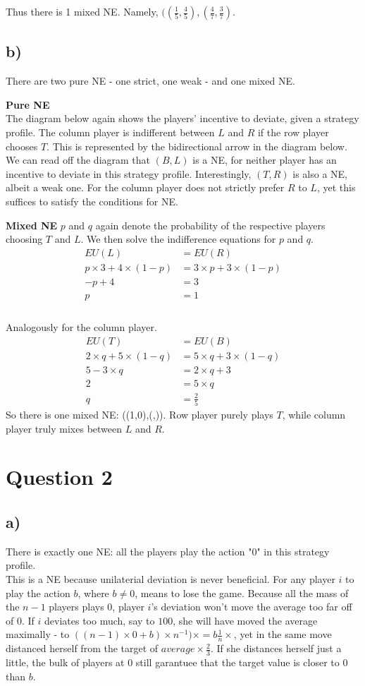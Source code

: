 \documentclass[10pt,a4paper]{article}
\begin{document}
Thus there is 1 mixed NE. Namely, $((\tfrac{1}{5},\tfrac{4}{5}),(\tfrac{4}{7},\tfrac{3}{7})$.
\subsection*{b)}
There are two pure NE - one strict, one weak - and one mixed NE.

\textbf{Pure NE}\\
The diagram below again shows the players' incentive to deviate, given a strategy profile.
The column player is indifferent between $L$ and $R$ if the row player chooses $T$. This is represented by the bidirectional arrow in the diagram below. We can read off the diagram that $(B,L)$ is a NE, for neither player has an incentive to deviate in this strategy profile. Interestingly, $(T,R)$ is also a NE, albeit a weak one. For the column player does not strictly prefer $R$ to $L$, yet this suffices to satisfy the conditions for NE.

\textbf{Mixed NE}
$p$ and $q$ again denote the probability of the respective players choosing $T$ and $L$. We then solve the indifference equations for $p$ and $q$.
\begin{align*}
EU(L)&=EU(R)\\
p\times 3 + 4\times (1-p)&= 3\times p + 3\times (1-p) \\
-p + 4 &= 3 \\
p &= 1 \\
\end{align*}\\
Analogously for the column player.\\
\begin{align*}
EU(T)&=EU(B)\\
2\times q + 5\times (1-q)&= 5\times q + 3\times (1-q) \\
5 - 3\times q &= 2\times q +3 \\
2 &= 5\times q \\
q &= \tfrac{2}{5}
\end{align*}
So there is one mixed NE: ((1,0),(,)). Row player purely plays $T$, while column player truly mixes between $L$ and $R$.
\section*{Question 2}
\subsection*{a)}
There is exactly one NE: all the players play the action "0" in this strategy profile.\\
This is a NE because unilaterial deviation is never beneficial. For any player $i$ to play the action $b$, where $b\neq 0$, means to lose the game. Because all the mass of the $n-1$ players plays $0$, player $i$'s deviation won't move the average too far off of $0$. If $i$ deviates too much, say to $100$, she will have moved the average maximally - to $((n-1)\times 0 + b)\times n^{-1})\times=b \tfrac{1}{n}\times$, yet in the same move distanced herself from the target of $average \times \tfrac{2}{3}$. If she distances herself just a little, the bulk of players at $0$ still garantuee that the target value is closer to $0$ than $b$.
\end{document}
